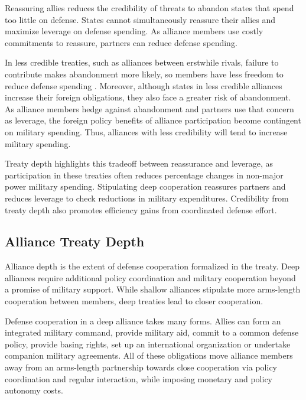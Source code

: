 \documentclass[12pt]{article}
\begin{document}
Reassuring allies reduces the credibility of threats to abandon states that spend too little on defense. 
States cannot simultaneously reassure their allies and maximize leverage on defense spending. 
As alliance members use costly commitments to reassure, partners can reduce defense spending. 


In less credible treaties, such as alliances between erstwhile rivals, failure to contribute makes abandonment more likely, so members have less freedom to reduce defense spending \citep{NiouZeigler2019}. 
Moreover, although states in less credible alliances increase their foreign obligations, they also face a greater risk of abandonment. 
As alliance members hedge against abandonment and partners use that concern as leverage, the foreign policy benefits of alliance participation become contingent on military spending. 
Thus, alliances with less credibility will tend to increase military spending. 


Treaty depth highlights this tradeoff between reassurance and leverage, as participation in these treaties often reduces percentage changes in non-major power military spending. 
Stipulating deep cooperation reassures partners and reduces leverage to check reductions in military expenditures. 
Credibility from treaty depth also promotes efficiency gains from coordinated defense effort.



\subsection{Alliance Treaty Depth} 


Alliance depth is the extent of defense cooperation formalized in the treaty. 
Deep alliances require additional policy coordination and military cooperation beyond a promise of military support. 
While shallow alliances stipulate more arms-length cooperation between members, deep treaties lead to closer cooperation. 


Defense cooperation in a deep alliance takes many forms. 
Allies can form an integrated military command, provide military aid, commit to a common defense policy, provide basing rights, set up an international organization or undertake companion military agreements. 
All of these obligations move alliance members away from an arms-length partnership towards close cooperation via policy coordination and regular interaction, while imposing monetary and policy autonomy costs. 
\end{document}
